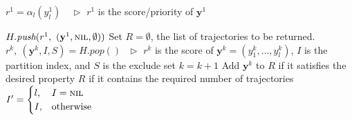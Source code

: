 \begin{algorithm}[htbp]
\begin{algorithmic}[1]
\STATE $r^1 = \alpha_{l}(y_l^1) \hspace{1em}\triangleright$ $r^1$ is the score/priority of $\mathbf{y}^1$

\STATE $H.\textit{push}(r^1,~ (\mathbf{y}^1, \textsc{nil}, \emptyset) )$
\STATE Set $R=\emptyset$, the list of trajectories to be returned.
    \STATE $r^k,~ (\mathbf{y}^k, I, S) = H.\textit{pop}()~~~ \triangleright$
           $r^k$ is the score of $\mathbf{y}^k=(y_1^k,\dots,y_l^k)$, $I$ is the partition index, and $S$ is the exclude set
    \STATE $k = k + 1$
    \STATE Add $\mathbf{y}^k$ to $R$ if it satisfies the desired property
    \RETURN $R$ if it contains the required number of trajectories
    \STATE $I' = \begin{cases}
                  l, & I = \textsc{nil} \\
                  I, & \text{otherwise}
                 \end{cases}$


\end{algorithmic}
\end{algorithm}
